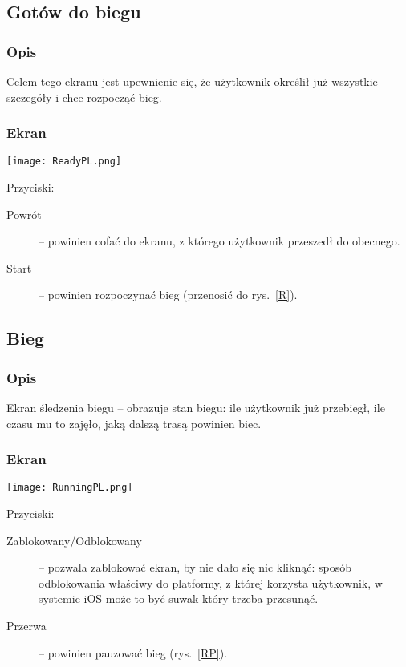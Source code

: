 \subsection{Gotów do biegu}
\subsubsection{Opis}
\noindent Celem tego ekranu jest upewnienie się, że użytkownik określił już wszystkie szczegóły i chce rozpocząć bieg. 
\subsubsection{Ekran}
\begin{minipage}{0.5\textwidth}
  \label{RR}
  \texttt{[image: ReadyPL.png]}
\end{minipage}
\begin{minipage}{0.5\textwidth}
Przyciski:\\
\begin{description}
  \item[Powrót] -- powinien cofać do ekranu, z którego użytkownik przeszedł do obecnego.
  \item[Start] -- powinien rozpoczynać bieg (przenosić do rys.~\ref{R}).
\end{description}
\end{minipage}
\subsection{Bieg}
\subsubsection{Opis}
\noindent Ekran śledzenia biegu -- obrazuje stan biegu: ile użytkownik już przebiegł, ile czasu mu to zajęło, jaką dalszą trasą powinien biec.
\subsubsection{Ekran}
\begin{minipage}{0.5\textwidth}
  \label{R}
  \texttt{[image: RunningPL.png]}
\end{minipage}
\begin{minipage}{0.5\textwidth}
Przyciski:\\
\begin{description}
  \item[Zablokowany/Odblokowany] -- pozwala zablokować ekran, by nie dało się nic kliknąć: sposób odblokowania właściwy do platformy, z której korzysta użytkownik, w systemie iOS może to być suwak który trzeba przesunąć.
  \item[Przerwa] -- powinien pauzować bieg (rys.~\ref{RP}).
\end{description}
\end{minipage}
